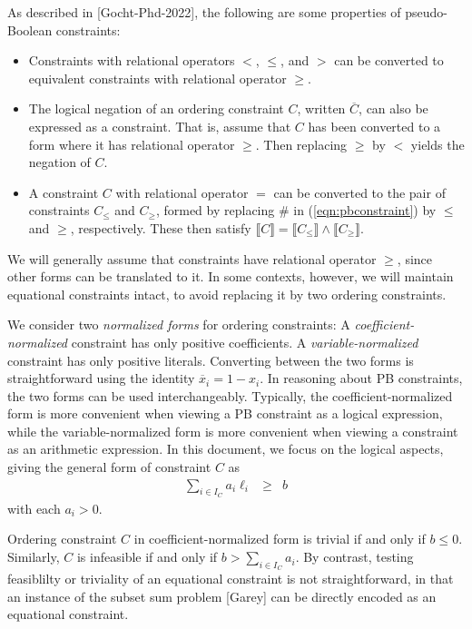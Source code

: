 \documentclass{easychair}
\renewcommand{\obar}[1]{\overline{#1}}
\newcommand{\lit}{\ell}
\newcommand{\indices}{I}
\newcommand{\func}[1]{\llbracket#1\rrbracket}
\begin{document}
As described in [Gocht-Phd-2022], the following are some properties of pseudo-Boolean constraints:
\begin{itemize}
\item Constraints with relational operators $<$, $\leq$, and $>$ can be
  converted to equivalent constraints with relational operator $\geq$.
\item
The logical negation of an ordering constraint $C$, written $\obar{C}$,
can also be expressed as a constraint.  That is, assume that $C$
has been converted to a form where it has relational operator $\geq$.
Then replacing $\geq$ by $<$ yields the negation of $C$.  
\item
A constraint $C$ with relational operator $=$ can be converted to the
pair of constraints $C_{\leq}$ and $C_{\geq}$, formed by replacing
$\#$ in (\ref{eqn:pbconstraint}) by $\leq$ and $\geq$, respectively.
These then satisfy $\func{C} = \func{C_{\leq}} \land \func{C_{\geq}}$.
\end{itemize}
We will generally
assume that constraints have relational operator $\geq$, since other
forms can be translated to it.  In some contexts, however, we will
maintain equational constraints 
intact, to avoid replacing it by two ordering constraints.


We consider two {\em normalized forms} for ordering constraints: A
{\em coefficient-normalized} constraint has only positive
coefficients.  A {\em variable-normalized} constraint has only
positive literals.  Converting between the two forms is
straightforward using the identity $\obar{x}_i = 1-x_i$.  In reasoning
about PB constraints, the two forms can be used interchangeably.
Typically, the coefficient-normalized form is more convenient when
viewing a PB constraint as a logical expression, while the
variable-normalized form is more convenient when viewing a constraint
as an arithmetic expression.  In this document, we focus on the logical
aspects, giving the general form of constraint $C$ as
\begin{eqnarray}
\sum_{i \in \indices_C} a_{i} \lit_{i} & \geq & b \label{eqn:coeff-normalized}
\end{eqnarray}
with each $a_{i} > 0$.

Ordering constraint $C$ in coefficient-normalized form is trivial if and only
if $b \leq 0$.  Similarly, $C$ is infeasible if and only if
$b > \sum_{i \in \indices_C} {a_{i}}$.  By contrast, testing feasiblilty or triviality
of an equational constraint is not straightforward, in that an instance of the
subset sum problem [Garey] can be directly encoded as an equational
constraint.
\end{document}
